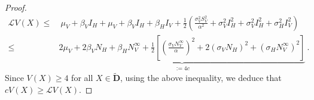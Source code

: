 \begin{proof}
    \begin{align*}
        \mathcal{L}V(X) 
        \leq &
            \ \mu_{V}
            +
            \beta_{V}I_{H} + \mu_{V}
            +
            \beta_{V} I_{H}
            +
            \beta_{H} I_{V}
            +
            \frac{1}{2}
            \left(
                \frac{
                    \sigma_{V}^{2} S_{V}^{2}
                }
                {
                    \alpha^{2}} 
                    + \sigma_{V} ^ {2}
                    I_{H} ^ {2} 
                    + \sigma_{V} ^ {2} I_{H}^{2} 
                    + \sigma_{H} ^ {2} I_{V}^{2}
            \right)
            \\
            \leq 
            &
            \underbrace{
                2\mu_{V}
                +
                2 \beta_{V} N_{H} 
                +
                \beta_{H}
                N_{V} ^ {\infty}
                +
                \frac{1}{2}
                \left[
                    \left(
                        \frac{ 
                            \sigma_{V}
                            N_{V} ^ {\infty}
                        }{
                            \alpha}
                    \right) ^ {2} 
                    +2
                    \left(
                        \sigma_{V} 
                        N_{H}
                    \right) ^ {2} 
                    + 
                    \left(
                        \sigma_{H}
                        N_{V} ^ {\infty}
                    \right) ^ {2}
                \right]
            }_{:= 4c} ~.
    \end{align*}
    Since $V(X) \geq 4$ for all $X \in \widetilde{\mathbf{D}}$, 
    using the above inequality, we deduce that 
    $
        cV 
        \left(
            X 
        \right)
        \geq 
        \mathcal{L} V
        \left(
             X 
        \right)
    $.
    

\end{proof}
